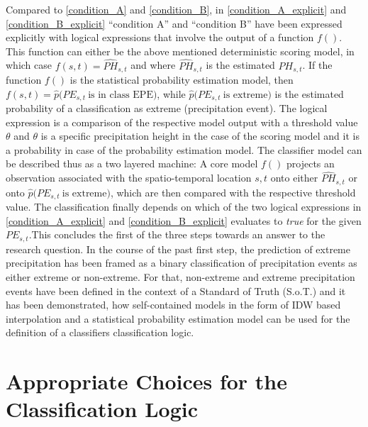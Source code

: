 \documentclass[
  12pt,
]{article}
\begin{document}
\begingroup
\justify

Compared to \ref{condition_A} and \ref{condition_B}, in
\ref{condition_A_explicit} and \ref{condition_B_explicit} ``condition
A'' and ``condition B'' have been expressed explicitly with logical
expressions that involve the output of a function \(f()\). This function
can either be the above mentioned deterministic scoring model, in which
case \(f(s,t)=\widehat{PH}_{s,t}\) and where \(\widehat{PH}_{s,t}\) is
the estimated \(PH_{s,t}\). If the function \(f()\) is the statistical
probability estimation model, then
\(f(s,t)=\widehat{p}(PE_{s,t}\:\text{is in class EPE)}\), while
\(\widehat{p}(PE_{s,t}\:\text{is extreme)}\) is the estimated
probability of a classification as extreme (precipitation event). The
logical expression is a comparison of the respective model output with a
threshold value \(\theta\) and \(\theta\) is a specific precipitation
height in the case of the scoring model and it is a probability in case
of the probability estimation model. The classifier model can be
described thus as a two layered machine: A core model \(f()\) projects
an observation associated with the spatio-temporal location \(s,t\) onto
either \(\widehat{PH}_{s,t}\) or onto
\(\widehat{p}(PE_{s,t}\:\text{is extreme)}\), which are then compared
with the respective threshold value. The classification finally depends
on which of the two logical expressions in \ref{condition_A_explicit}
and \ref{condition_B_explicit} evaluates to \textit{true} for the given
\(PE_{s,t}\).\newline This concludes the first of the three steps
towards an answer to the research question. In the course of the past
first step, the prediction of extreme precipitation has been framed as a
binary classification of precipitation events as either extreme or
non-extreme. For that, non-extreme and extreme precipitation events have
been defined in the context of a Standard of Truth (S.o.T.) and it has
been demonstrated, how self-contained models in the form of IDW based
interpolation and a statistical probability estimation model can be used
for the definition of a classifiers classification logic. \endgroup

\hypertarget{appropriate-choices-for-the-classification-logic}{%
\section{Appropriate Choices for the Classification
Logic}\label{appropriate-choices-for-the-classification-logic}}
\end{document}
